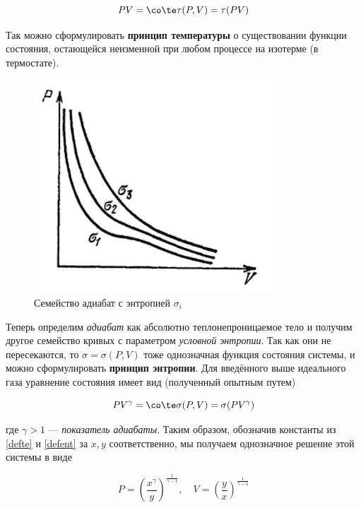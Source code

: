 \documentclass[12pt]{kiarticle}
\begin{document}
\begin{equation}\label{defte}
PV = \co \te \tau (P, V) = \tau (PV)
\end{equation}

Так можно сформулировать \textbf{принцип температуры} о существовании функции состояния, остающейся неизменной при любом процессе на изотерме (в термостате).

\begin{figure} 
	\includegraphics{entdef}
	\caption{Семейство адиабат с энтропией $ \sigma_i $}
\end{figure}

Теперь определим \textit{адиабат} как абсолютно теплонепроницаемое тело и получим другое семейство кривых с параметром \textit{условной энтропии}. Так как они не пересекаются, то $ \sigma = \sigma (P, V) $ тоже однозначная функция состояния системы, и можно сформулировать \textbf{принцип энтропии}. Для введённого выше идеального газа  уравнение состояния имеет вид (полученный опытным путем)

\begin{equation}\label{defent}
PV^\gamma = \co \te \sigma (P, V) = \sigma (PV^\gamma)
\end{equation}

где $ \gamma > 1 $ --- \textit{показатель адиабаты}. Таким образом, обозначив константы из \eqref{defte} и \eqref{defent} за $ x, y $ соответственно, мы получаем однозначное решение этой системы в виде

\begin{equation}\label{xy}
P = \left( \dfrac{x^\gamma}{y} \right)^\frac{1}{\gamma -1}, \quad V = \left (\dfrac{y}{x} \right )^\frac{1}{\gamma -1} 
\end{equation}
\end{document}
